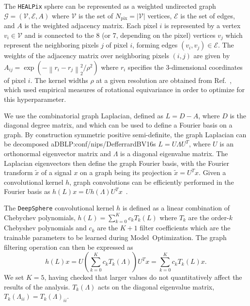 \documentclass[prd,aps,10pt,nofootinbib,twocolumn,superscriptaddress,preprintnumbers,balancelastpage,longbibliography,floatfix]{revtex4-2}
\begin{document}
The \texttt{HEALPix} sphere can be represented as a weighted undirected graph $\mathcal G = (\mathcal V, \mathcal E, A)$ where $\mathcal V$ is the set of $N_\mathrm{pix} = |\mathcal V|$ vertices, $\mathcal E$ is the set of edges, and $A$ is the weighted adjacency matrix. Each pixel $i$ is represented by a vertex $v_i \in \mathcal V$ and is connected to the 8 (or 7, depending on the pixel)
vertices $v_j$ which represent the neighboring pixels $j$ of pixel $i$, forming edges $(v_i
, v_j) \in \mathcal E$. The weights of the adjacency matrix over neighboring pixels $(i, j)$ are given by $A_{ij} = \exp \left(-{\left\|r_{i}-r_{j}\right\|_{2}^{2}}/{\rho^{2}}\right)$ where $r_i$ specifies the 3-dimensional coordinates of pixel $i$. The kernel widths $\rho$ at a given \HEALPix resolution are obtained from Ref.~\cite{DBLP:conf/iclr/DefferrardMGP20}, which used empirical measures of rotational equivariance in order to optimize for this hyperparameter.

We use the combinatorial graph Laplacian, defined as $ L =  D -  A$, where $ D$ is the diagonal degree matrix, and which can be used to define a Fourier basis on a graph. By construction symmetric positive semi-definite, the graph Laplacian can be decomposed aDBLP:conf/nips/DefferrardBV16s $ L =  U  \Lambda  U^T$, where $ U$ is an orthonormal eigenvector matrix and $ \Lambda$ is a diagonal eigenvalue matrix. The Laplacian eigenvectors then define the graph Fourier basis, with the Fourier transform $\tilde{ x}$ of a signal $ x$ on a graph being its projection $\tilde{x} =  U^T  x$.
Given a convolutional kernel $h$, graph convolutions can be efficiently performed in the Fourier basis as $h({L}) {x}={U} h({\Lambda}) {U}^{T} {x}$~\cite{DBLP:conf/nips/DefferrardBV16}.

The \texttt{DeepSphere} convolutional kernel $h$ is defined as a linear combination of Chebychev polynomials, $h({{L}}) = \sum_{k=0}^{K} c_{k} T_{k}({{L}})$ where $T_k$ are the order-$k$ Chebyshev polynomials and $c_k$ are the $K + 1$ filter coefficients which are the trainable parameters to be learned during {Model~O}ptimization. The graph filtering operation can then be expressed as
\begin{equation}
h({L}) {x}={U}\left(\sum_{k=0}^{K} c_{k} T_k({\Lambda})\right) {U}^{T} {x}=\sum_{k=0}^{K} c_{k} T_k({L}) {x}.
\end{equation}
We set $K=5$, having checked that larger values do not quantitatively affect the results of the analysis. $T_k({\Lambda})$ acts on the diagonal eigenvalue matrix, $T_k({\Lambda_{ii}}) = T_k({\Lambda})_{ii}$. 
\end{document}
